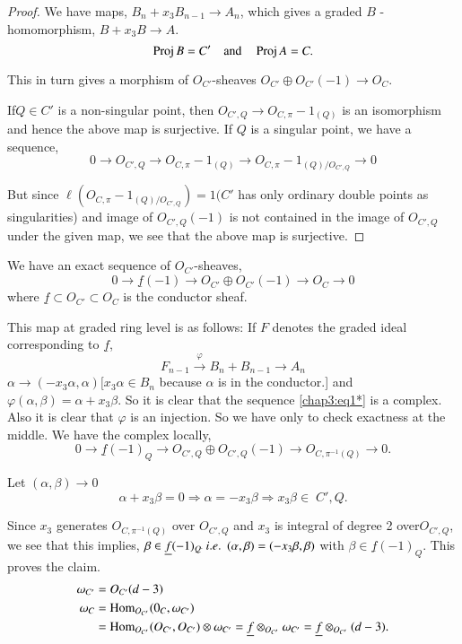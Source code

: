 \begin{proof}
We have maps, $B_n+x_3 B_{n-1}\longrightarrow A_n$, which gives a
graded $B$ - homomorphism, $B+x_3B\longrightarrow A$. 
$$
\operatorname{Proj} B=C'\quad\text{and}\quad\operatorname{Proj} A=C.
$$

This in turn gives a morphism of $O_{C'}$-sheaves $O_{C'}\oplus O_{C'}
(-1)\longrightarrow O_C$. 

If\pageoriginale $Q\in C'$ is a non-singular point, then $O_{C',Q}
\longrightarrow O_{C,\pi}-1_{(Q)}$ is an isomorphism and hence the
above map is surjective. If $Q$ is a singular point, we have a
sequence,
$$
0\longrightarrow O_{C',Q}\longrightarrow O_{C,\pi}-1_{(Q)}
\longrightarrow O_{C,\pi}-1_{(Q)/O_{C',Q}}\longrightarrow 0
$$

But since $\ell(O_{C,\pi}-1_{(Q)/O_{C',Q}})=1(C'$ has only ordinary
double points as singularities) and image of $O_{C',Q}(-1)$ is not
contained in the image of $O_{C',Q}$ under the given map, we see that
the above map is surjective. 
\end{proof}

\begin{claim*}
We have an exact sequence of $O_{C'}$-sheaves,
\begin{equation*}
0\longrightarrow\underline{f}(-1)\longrightarrow O_{C'}\oplus
O_{C'}(-1)\longrightarrow O_C\longrightarrow 0\tag{*}\label{chap3:eq1*}
\end{equation*}
where $\underline{f}\subset O_{C'}\subset O_C$ is the conductor sheaf.
\end{claim*}

This map at graded ring level is as follows: If $F$ denotes the graded
ideal corresponding to $\underline{f}$,
$$
F_{n-1}\xrightarrow{\varphi}B_n+B_{n-1}\longrightarrow A_n
$$
$\alpha\longrightarrow(-x_3\alpha,\alpha)[x_3\alpha\in B_n$ because
$\alpha$ is in the conductor.] and $\varphi(\alpha,\beta)=\alpha
+x_3\beta$. So it is clear that the sequence \eqref{chap3:eq1*} is a
complex. Also it is clear that $\varphi$ is an injection. So we have
only to check exactness at the middle. We have the complex locally,
$$
0\longrightarrow\underline{f}(-1)_Q\longrightarrow O_{C',Q}\oplus
O_{C',Q}(-1)\longrightarrow O_{C,\pi^{-1}(Q)}\longrightarrow 0.
$$

Let $(\alpha,\beta)\longrightarrow 0$ \ie
$$
\alpha +x_3\beta =0\Longrightarrow\alpha = -x_3\beta\Longrightarrow
x_3 \beta\in \; C',Q.
$$

Since $x_3$ generates $O_{C,\pi^{-1}(Q)}$ over $O_{C',Q}$ and $x_3$ is
integral of degree 2 over\pageoriginale $O_{C',Q}$, we see that this
implies, $\beta\in\underline{f}(-1)_{Q^.}\,{i.e.}\kern.3em\,(\alpha,\beta)=
(-x_3\beta,\beta)$ with $\beta\in\underline{f}(-1)_Q$. This proves the
claim.
\begin{align*}
\omega_{C'} &= O_{C'}(d-3)\\
\omega_C &= \operatorname{Hom}_{O_{C'}}(0_C,\omega_{C'})\\
&= \operatorname{Hom}_{O_{C'}}(O_{C'},O_{C'})\otimes\omega_{C'}=\underline{f}
\otimes_{O_{C'}}\omega_{C'}=\underline{f}\otimes_{O_{C'}}(d-3).
\end{align*}


